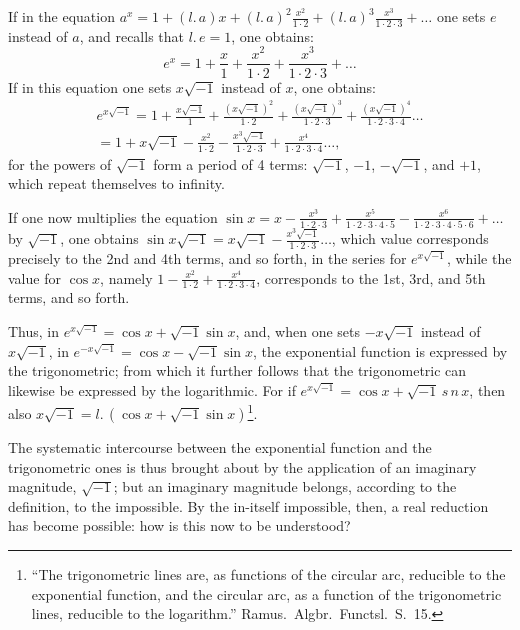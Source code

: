 \documentclass[12pt]{book}
\begin{document}
If in the equation $a^{x} = 1 + (l.\,a)x + (l.\,a)^{2}\frac{x^{2}}{1\cdot 2}
+ (l.\,a)^{3}\frac{x^{3}}{1\cdot 2\cdot 3} + \dots$ one sets $e$ instead of $a$, and
recalls that $l.\,e = 1$, one obtains:
\[
e^{x} = 1 + \frac{x}{1} + \frac{x^{2}}{1\cdot 2} + \frac{x^{3}}{1\cdot 2\cdot 3}
+ \dots
\]
If in this equation one sets $x\sqrt{-1}$ instead of $x$, one obtains:
\begin{multline*}
e^{x\sqrt{-1}} = 1 + \frac{x\sqrt{-1}}{1} + \frac{(x\sqrt{-1})^{2}}{1\cdot 2}
+ \frac{(x\sqrt{-1})^{3}}{1\cdot 2\cdot 3} + \frac{(x\sqrt{-1})^{4}}{1\cdot 2\cdot
3\cdot 4}\dots \\
= 1 + x\sqrt{-1} - \frac{x^{2}}{1\cdot 2} - \frac{x^{3}\sqrt{-1}}{1\cdot 2\cdot 3}
+ \frac{x^{4}}{1\cdot 2\cdot 3\cdot 4}\dots,
\end{multline*}
for the powers of $\sqrt{-1}$ form a period of 4 terms: $\sqrt{-1}$, $-1$,
$-\sqrt{-1}$, and $+1$, which repeat themselves to infinity.

If one now multiplies the equation $\sin x = x - \frac{x^{3}}{1\cdot 2\cdot 3} +
\frac{x^{5}}{1\cdot 2\cdot 3\cdot 4\cdot 5} - \frac{x^{6}}{1\cdot 2\cdot 3\cdot
4\cdot 5\cdot 6} + \dots$
by $\sqrt{-1}$, one obtains $\sin x\sqrt{-1} = x\sqrt{-1} -
\frac{x^{3}\sqrt{-1}}{1\cdot 2\cdot 3}\dots$, which value corresponds precisely to
the 2nd and 4th terms, and so forth, in the series for $e^{x\sqrt{-1}}$, while the
value for $\cos x$, namely $1 - \frac{x^{2}}{1\cdot 2} + \frac{x^{4}}{1\cdot 2\cdot
3\cdot 4}$, corresponds to the 1st, 3rd, and 5th terms, and so forth.

Thus, in $e^{x\sqrt{-1}} = \cos x + \sqrt{-1}\sin x$, and, when one sets
$-x\sqrt{-1}$ instead of $x\sqrt{-1}$, in $e^{-x\sqrt{-1}} = \cos x - \sqrt{-1}\sin x$,
the exponential function is expressed by the trigonometric; from which it further
follows that the trigonometric can likewise be expressed by the logarithmic. For if
$e^{x\sqrt{-1}} = \cos x + \sqrt{-1}\,s\,n\,x$,
then also $x\sqrt{-1} = l.\,(\cos x + \sqrt{-1}\sin x)$\footnote{``The
trigonometric lines are, as functions of the circular arc, reducible to the
exponential function, and the circular arc, as a function of the trigonometric
lines, reducible to the logarithm.'' Ramus.\ Algbr.\ Functsl.\ S.\ 15.}.

The systematic intercourse between the exponential function and the trigonometric
ones is thus brought about by the application of an imaginary magnitude, $\sqrt{-1}$;
but an imaginary magnitude belongs, according to the definition, to the impossible.
By the in-itself impossible, then, a real reduction has become possible: how is this
now to be understood?
\end{document}
